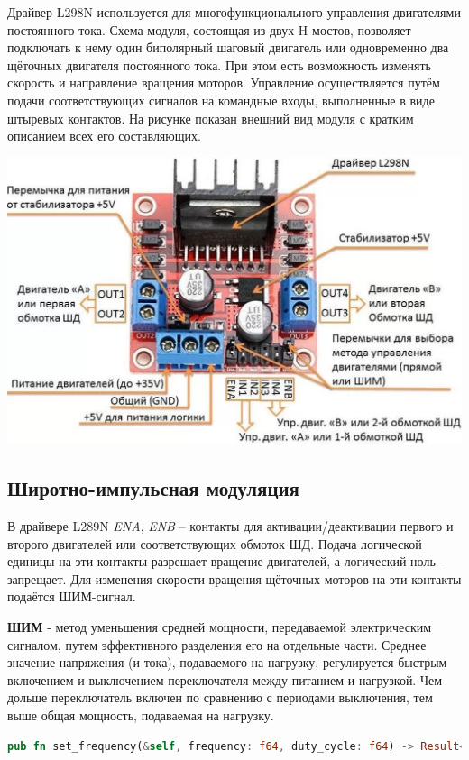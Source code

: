 \documentclass[a4paper,12pt]{article}
\begin{document}
Драйвер L298N используется для многофункционального управления двигателями постоянного тока.
Схема модуля, состоящая из двух H-мостов, позволяет подключать к нему один биполярный шаговый двигатель или одновременно два щёточных
двигателя постоянного тока. При этом есть возможность изменять скорость и направление вращения моторов. Управление осуществляется путём
подачи соответствующих сигналов на командные входы, выполненные в виде штыревых контактов. На рисунке показан внешний вид модуля с кратким
описанием всех его составляющих.
\begin{center}
\includegraphics[scale=0.5]{l298n.pdf}
\end{center}

\subsection{Широтно-импульсная модуляция}

В драйвере L289N \textit{ENA}, \textit{ENB} –  контакты для активации/деактивации первого и второго двигателей или соответствующих обмоток ШД.
Подача логической единицы на эти контакты разрешает вращение двигателей, а логический ноль – запрещает.
Для изменения скорости вращения щёточных моторов на эти контакты подаётся ШИМ-сигнал.

\textbf{ШИМ} - метод уменьшения средней мощности, передаваемой электрическим сигналом, путем эффективного разделения его на отдельные части.
Среднее значение напряжения (и тока), подаваемого на нагрузку, регулируется быстрым включением и выключением переключателя между питанием и нагрузкой.
Чем дольше переключатель включен по сравнению с периодами выключения, тем выше общая мощность, подаваемая на нагрузку.

\begin{lstlisting}[language=Rust, style=boxed]
  pub fn set_frequency(&self, frequency: f64, duty_cycle: f64) -> Result<()>
\end{lstlisting}
\end{document}
